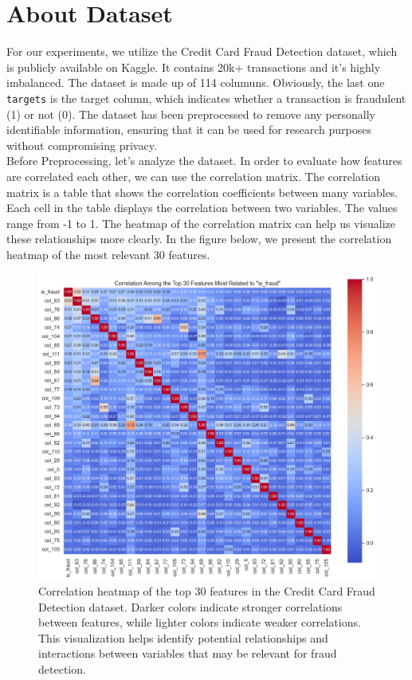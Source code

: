 \documentclass[10pt]{article}
\begin{document}
\section{About Dataset}
For our experiments, we utilize the Credit Card Fraud Detection dataset, which is publicly available on Kaggle. It contains 20k+ transactions and it's highly imbalanced. The dataset is made up of 114 columuns. Obviously, the last one \texttt{targets} is the target column, which indicates whether a transaction is fraudulent (1) or not (0). The dataset has been preprocessed to remove any personally identifiable information, ensuring that it can be used for research purposes without compromising privacy.\\
Before Preprocessing, let's analyze the dataset. In order to evaluate how features are correlated each other, we can use the correlation matrix. The correlation matrix is a table that shows the correlation coefficients between many variables. Each cell in the table displays the correlation between two variables. The values range from -1 to 1. The heatmap of the correlation matrix can help us visualize these relationships more clearly. In the figure below, we present the correlation heatmap of the most relevant 30 features. 
\begin{figure}[h!]
	\centering
	\includegraphics[height = 0.6\textheight]{img/correlation_heatmap_top_30_features.png}
	\caption{Correlation heatmap of the top 30 features in the Credit Card Fraud Detection dataset. Darker colors indicate stronger correlations between features, while lighter colors indicate weaker correlations. This visualization helps identify potential relationships and interactions between variables that may be relevant for fraud detection.}
\end{figure}
\end{document}
